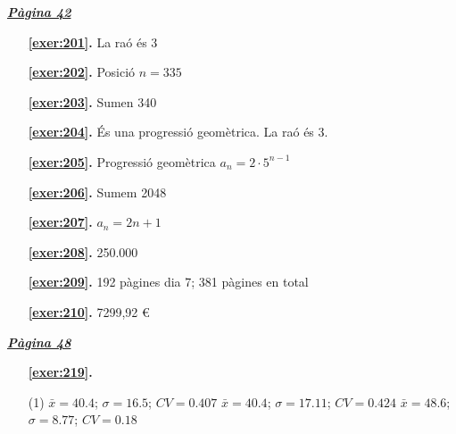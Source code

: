 \hyperlink{page.42}{\textbf{\em Pàgina 42}}
\begin{enumerate}
\item[\fontfamily{phv}\selectfont\color{blue}\textbf{\ref{exer:201}. }] \label{ans:201} 
La raó és 3
 \end{enumerate}
\begin{enumerate}
\item[\fontfamily{phv}\selectfont\color{blue}\textbf{\ref{exer:202}. }] \label{ans:202} 
Posició $n=335$
\item[\fontfamily{phv}\selectfont\color{blue}\textbf{\ref{exer:203}. }] \label{ans:203} 
Sumen 340
\item[\fontfamily{phv}\selectfont\color{blue}\textbf{\ref{exer:204}. }] \label{ans:204} 
És una progressió geomètrica. La raó és 3.
\item[\fontfamily{phv}\selectfont\color{blue}\textbf{\ref{exer:205}. }] \label{ans:205} 
Progressió geomètrica $a_{n} = 2·5^{n-1}$ 
\item[\fontfamily{phv}\selectfont\color{blue}\textbf{\ref{exer:206}. }] \label{ans:206} 
Sumem 2048
\item[\fontfamily{phv}\selectfont\color{blue}\textbf{\ref{exer:207}. }] \label{ans:207} 
 $a_{ n} = 2n + 1$ 
\item[\fontfamily{phv}\selectfont\color{blue}\textbf{\ref{exer:208}. }] \label{ans:208} 
250.000
\item[\fontfamily{phv}\selectfont\color{blue}\textbf{\ref{exer:209}. }] \label{ans:209} 
192 pàgines dia 7; 381 pàgines en total
\item[\fontfamily{phv}\selectfont\color{blue}\textbf{\ref{exer:210}. }] \label{ans:210} 
7299,92 \euro {}
 \end{enumerate}

 \vspace{1cm} 
 

\vspace{0.3cm}


\hyperlink{page.48}{\textbf{\em Pàgina 48}}
\begin{enumerate}



 \item[\fontfamily{phv}\selectfont\color{blue}\textbf{\ref{exer:219}. }] \label{ans:219}
 \begin{tasks}[column-sep=1em, item-indent=1.3333em](1)
	 \task* $\bar x=40.4$; $\sigma =16.5$; $CV=0.407$
	 \task* $\bar x=40.4$; $\sigma =17.11$; $CV=0.424$
	 \task* $\bar x=48.6$; $\sigma =8.77$; $CV=0.18$
\end{tasks}
 \end{enumerate}
\vspace{0.3cm}

